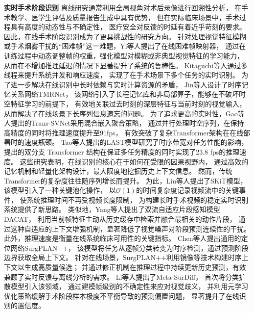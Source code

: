 \textbf{实时手术阶段识别}\quad
离线研究通常利用全局视角对术后录像进行回溯性分析，
在手术教学、医学生评估及质量报告生成中具有优势，
但在实际临床场景中，手术过程具有高度的动态性与不确定性，
医疗安全对反馈的时延有着近乎苛刻的要求。
因此，在线手术阶段识别成为了更具挑战性的研究方向。
针对处理视觉特征模糊或手术烟雾干扰的“困难帧”这一难题，Yi等人\cite{yi2019hard}提出了在线困难帧映射器，
通过在训练过程中动态调整帧的权重，强化模型对模糊或非典型视觉特征的学习能力，
从而在不增加推理延迟的情况下显著提升了系统的鲁棒性。
Kitaguchi等人\cite{kitaguchi2020real}通过多线程来提升系统并发和响应速度，
实现了在手术场景下多个任务的实时识别。
为了进一步解决在线识别中长时依赖与实时计算资源的矛盾，
Jin等人\cite{jin2021temporal}设计了时序记忆关系网络TMRNet，
该网络引入了长程记忆库和非局部算子，能够在不破坏时空特征学习的前提下，
有效地关联过去时刻的深层特征与当前时刻的视觉输入，
从而解决了在线场景下长序列信息遗忘的问题。
为了追求更高的实时性，Gao等人\cite{gao2021trans}提出的Trans-SVNet采用混合嵌入聚合策略，
通过并行处理时空序列，在保持高精度的同时将推理速度提升至91fps，
有效突破了复杂Transformer架构在在线部署时的速度瓶颈。
Tao等人\cite{tao2023last}提出的LAST模型研究了时序带宽对任务性能的影响，
提出的双分支 Transformer 结构在保证多任务精度的同时实现了23.8 fps的推理速度。
这些研究表明，在线识别的核心在于如何在受限的因果视野内，
通过高效的记忆机制和轻量化架构设计，最大限度地挖掘历史上下文信息。
然而，传统Transformer的复杂度往往随序列增长而提升。
为此，Liu等人\cite{skit2023}提出了SKiT模型，该模型引入了一种关键池化操作，
以\(\mathcal{O}(1)\)的时间复杂度记录视频流中的关键事件，
使系统推理时间不再受视频长度限制，
为构建长时手术视频的稳定实时识别系统提供了新思路。
类似地，Yang等人\cite{yang2025dacat}提出了双流自适应片段感知模型DACAT，
利用当前帧特征主动从历史缓存中检索并融合最相关的动作片段，
通过这种自适应的上下文增强机制，显著降低了视觉噪声对阶段预测连续性的干扰。
此外，推理速度是衡量在线系统临床可用性的关键指标。
Chen等人\cite{chen2025surgplan++}提出通用的定位网络SurgPLAN++，
该模型将任务从逐帧分类转变为时序检测，通过预测阶段边界获取全局上下文。
针对在线场景，SurgPLAN++利用镜像等技术构建时序上下文以生成高质量候选；
并通过修正机制在推理过程中持续更新历史预测，有效兼顾了实时反馈与离线分析的需求。
Li等人\cite{li2025meta}提出了Meta-SurDiff，
首次将分类扩散模型引入该领域，
通过建模帧级别的不确定性来应对视觉歧义，
并利用元学习优化策略缓解手术阶段样本极度不平衡导致的预测偏置问题，
显著提升了在线识别的置信度。

